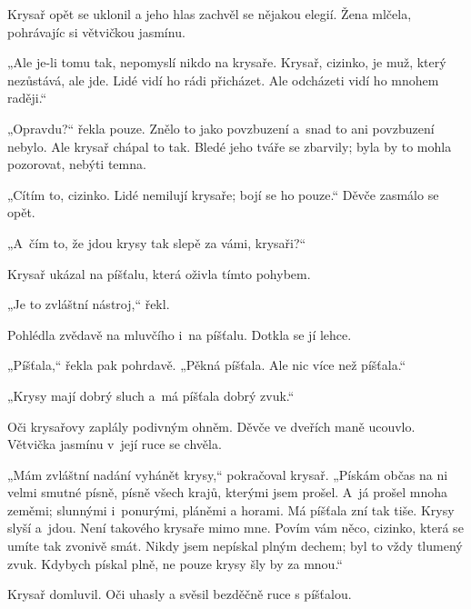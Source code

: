 Krysař opět se uklonil a jeho hlas zachvěl se nějakou elegií. Žena mlčela, pohrávajíc si větvičkou jasmínu.

„Ale je-li tomu tak, nepomyslí nikdo na krysaře. Krysař, cizinko, je muž, který nezůstává, ale jde. Lidé vidí ho rádi přicházet. Ale odcházeti vidí ho mnohem raději.“

„Opravdu?“ řekla pouze. Znělo to jako povzbuzení a~snad to ani povzbuzení nebylo. Ale krysař chápal to tak. Bledé jeho tváře se zbarvily; byla by to mohla pozorovat, nebýti temna.

„Cítím to, cizinko. Lidé nemilují krysaře; bojí se ho pouze.“ Děvče zasmálo se opět.

„A~čím to, že jdou krysy tak slepě za vámi, krysaři?“

Krysař ukázal na píšťalu, která oživla tímto pohybem.

„Je to zvláštní nástroj,“ řekl.

Pohlédla zvědavě na mluvčího i~na píšťalu. Dotkla se jí lehce.

„Píšťala,“ řekla pak pohrdavě. „Pěkná píšťala. Ale nic více než píšťala.“

„Krysy mají dobrý sluch a~má píšťala dobrý zvuk.“

Oči krysařovy zaplály podivným ohněm. Děvče ve dveřích maně ucouvlo. Větvička jasmínu v~její ruce se chvěla.

„Mám zvláštní nadání vyhánět krysy,“ pokračoval krysař. „Pískám občas na ni velmi smutné písně, písně všech krajů, kterými jsem prošel. A~já prošel mnoha zeměmi; slunnými i~ponurými, pláněmi a horami. Má píšťala zní tak tiše. Krysy slyší a~jdou. Není takového krysaře mimo mne. Povím vám něco, cizinko, která se umíte tak zvonivě smát. Nikdy jsem nepískal plným dechem; byl to vždy tlumený zvuk. Kdybych pískal plně, ne pouze krysy šly by za mnou.“

Krysař domluvil. Oči uhasly a svěsil bezděčně ruce s píšťalou.

\cite[4-5]{krysař}
